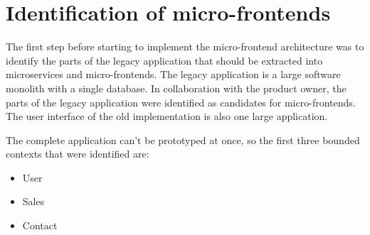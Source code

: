 \section{Identification of micro-frontends}\label{section:applied-methods:identification-micro-frontends}

The first step before starting to implement the micro-frontend architecture was to identify the parts of the legacy application that should be extracted into microservices and micro-frontends. The legacy application is a large software monolith with a single database. In collaboration with the product owner, the parts of the legacy application were identified as candidates for micro-frontends. The user interface of the old implementation is also one large application.

\bigskip

\noindent The complete application can't be prototyped at once, so the first three bounded contexts that were identified are: 

\begin{itemize}
  \item User
  \item Sales
  \item Contact
\end{itemize}